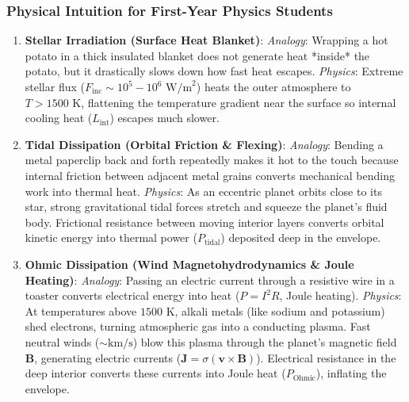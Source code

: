 \subsubsection{Physical Intuition for First-Year Physics Students}
\begin{enumerate}
    \item \textbf{Stellar Irradiation (Surface Heat Blanket)}: 
          \textit{Analogy}: Wrapping a hot potato in a thick insulated blanket does not generate heat *inside* the potato, but it drastically slows down how fast heat escapes.
          \textit{Physics}: Extreme stellar flux ($F_{\text{inc}} \sim 10^5 - 10^6\text{ W/m}^2$) heats the outer atmosphere to $T > 1500\text{ K}$, flattening the temperature gradient near the surface so internal cooling heat ($L_{\text{int}}$) escapes much slower.
    \item \textbf{Tidal Dissipation (Orbital Friction \& Flexing)}:
          \textit{Analogy}: Bending a metal paperclip back and forth repeatedly makes it hot to the touch because internal friction between adjacent metal grains converts mechanical bending work into thermal heat.
          \textit{Physics}: As an eccentric planet orbits close to its star, strong gravitational tidal forces stretch and squeeze the planet's fluid body. Frictional resistance between moving interior layers converts orbital kinetic energy into thermal power ($P_{\mathrm{tidal}}$) deposited deep in the envelope.
    \item \textbf{Ohmic Dissipation (Wind Magnetohydrodynamics \& Joule Heating)}:
          \textit{Analogy}: Passing an electric current through a resistive wire in a toaster converts electrical energy into heat ($P = I^2 R$, Joule heating).
          \textit{Physics}: At temperatures above $1500\text{ K}$, alkali metals (like sodium and potassium) shed electrons, turning atmospheric gas into a conducting plasma. Fast neutral winds ($\sim \text{km/s}$) blow this plasma through the planet's magnetic field $\mathbf{B}$, generating electric currents ($\mathbf{J} = \sigma (\mathbf{v} \times \mathbf{B})$). Electrical resistance in the deep interior converts these currents into Joule heat ($P_{\mathrm{Ohmic}}$), inflating the envelope.
\end{enumerate}

